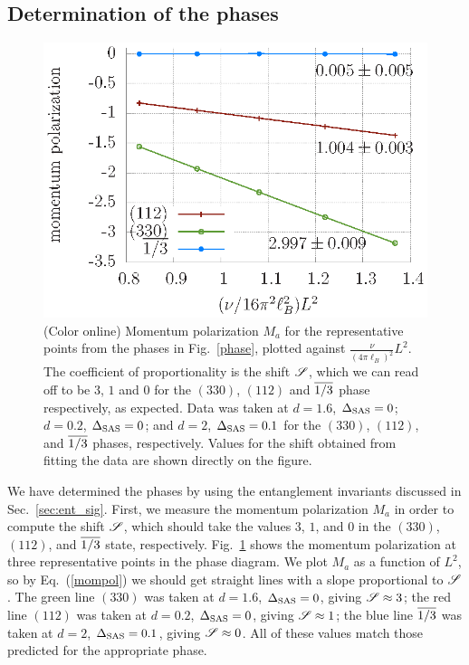 \subsection{Determination of the phases}\label{sec:determination}

\begin{figure}[ttt]
	\includegraphics[width=0.6\linewidth]{figures/mompol.eps}
	\caption{(Color online)
		Momentum polarization $M_a$ for the representative points from the phases in Fig.~\ref{phase}, plotted against $\frac{\nu}{(4\pi\ell_B)^2}L^2$.
		The coefficient of proportionality is the shift $\mathscr{S}$, which we can read off to be $3$, $1$ and $0$ for the $(330)$, $(112)$ and $\overline{1/3}$ phase respectively, as expected.
		Data was taken at $d=1.6$, $\Delta_\textrm{SAS}=0$; $d=0.2$, $\Delta_\textrm{SAS}=0$; and $d=2$, $\Delta_\textrm{SAS}=0.1$ for the $(330)$, $(112)$, and $\overline{1/3}$ phases, respectively. Values for the shift obtained from fitting the data are shown directly on the figure.
	}
	\label{mompolfig}
\end{figure}
We have determined the phases by using the entanglement invariants discussed in Sec.~\ref{sec:ent_sig}.
First, we measure the momentum polarization $M_a$  in order to compute the shift $\mathscr{S}$, which should take the values $3$, $1$, and $0$ in the $(330)$, $(112)$, and $\overline{1/3}$ state, respectively. 
Fig.~\ref{mompolfig} shows the momentum polarization at three representative points in the phase diagram.
We plot $M_a$  as a function of $L^2$, so by Eq.~(\ref{mompol}) we should get straight lines with a slope proportional to $\mathscr{S}$.
The green line $(330)$ was taken at $d=1.6$, $\Delta_\textrm{SAS}=0$, giving $\mathscr{S} \approx 3$;
the red line $(112)$ was taken at $d=0.2$, $\Delta_\textrm{SAS}=0$, giving $\mathscr{S} \approx 1$;
the blue line $\overline{1/3}$ was taken at $d=2$, $\Delta_\textrm{SAS}=0.1$, giving $\mathscr{S} \approx 0$.
All of these values match those predicted for the appropriate phase.

